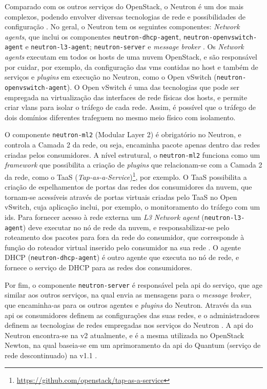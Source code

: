 \begin{sloppypar}
Comparado com os outros serviços do OpenStack, o Neutron é um dos mais complexos, podendo envolver diversas tecnologias de rede e possibilidades de configuração \cite{denton:2016:neutron}.
%
No geral, o Neutron tem os seguintes componentes: \textit{Network agents}, que inclui os componentes \texttt{neutron-dhcp-agent}, \texttt{neutron-openvswitch-agent} e \texttt{neutron-l3-agent}; \texttt{neutron-server} e \textit{message broker} \cite{openstack:neutron}.
%
Os \textit{Network agents} executam em todos os hosts de uma nuvem OpenStack, e são responsável por cuidar, por exemplo, da configuração das \acp{vm} contidas no host e também de serviços e \textit{plugins} em execução no Neutron, como o Open vSwitch (\texttt{neutron-openvswitch-agent}).
%
O Open vSwitch é uma das tecnologias que pode ser empregada na virtualização das interfaces de rede físicas dos hosts, e permite criar \acp{vlan} para isolar o tráfego de cada rede.
%
Assim, é possível que o tráfego de dois domínios diferentes trafeguem no mesmo meio físico com isolamento.
\end{sloppypar}

O componente \texttt{neutron-ml2} (Modular Layer 2) é obrigatório no Neutron, e controla a Camada 2 da rede, ou seja, encaminha pacote apenas dentro das redes criadas pelos consumidores.
%
A nível estrutural, o \texttt{neutron-ml2} funciona como um \textit{framework} que possibilita a criação de \textit{plugins} que relacionam-se com a Camada 2 da rede, como o TaaS (\textit{Tap-as-a-Service})\footnote{\url{https://github.com/openstack/tap-as-a-service}}, por exemplo.
%
O TaaS possibilita a criação de espelhamentos de portas das redes dos consumidores da nuvem, que tornam-se acessíveis através de portas virtuais criadas pelo TaaS no Open vSwitch, cuja aplicação inclui, por exemplo, o monitoramento do tráfego com um \ac{ids}.
%
Para fornecer acesso à rede externa um \textit{L3 Network agent} (\texttt{neutron-l3-agent}) deve executar no nó de rede da nuvem, e responsabilizar-se pelo roteamento dos pacotes para fora da rede do consumidor, que corresponde à função do roteador virtual inserido pelo consumidor na sua rede \cite{redhat:components}.
%
O agente DHCP (\texttt{neutron-dhcp-agent}) é outro agente que executa no nó de rede, e fornece o serviço de DHCP para as redes dos consumidores.

Por fim, o componente \texttt{neutron-server} é responsável pela \ac{api} do serviço, que age similar aos outros serviços, na qual envia as mensagens para o \textit{message broker}, que encaminha-as para os outros agentes e \textit{plugins} do Neutron.
%
Através da sua \ac{api} os consumidores definem as configurações das suas redes, e o administradores definem as tecnologias de redes empregadas nos serviços do Neutron \cite{denton:2016:neutron}.
%
A \ac{api} do Neutron encontra-se na v2 atualmente, e é a mesma utilizada no OpenStack Newton, na qual baseia-se em um aprimoramento da \ac{api} do Quantum (serviço de rede descontinuado) na v1.1 \cite{openstack:newton:api}.


